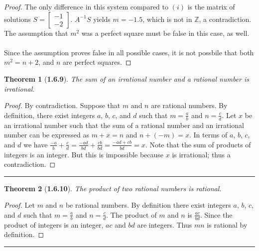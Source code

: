 \documentclass[a4paper, 12pt]{article}
\theoremstyle{plain}
\newtheorem*{theorem*}{Theorem}
\begin{document}
\begin{proof}
    The only difference in this system compared to $(i)$ is the matrix of solutions 
    $S = \left[\begin{smallmatrix}
        -1 \\
        -2
    \end{smallmatrix}\right]$. $A^{-1}S$ yields $m = -1.5$, which is not in $\mathbb{Z}$,
    a contradiction. The assumption that $m^2$ was a perfect square must be false in this case, 
    as well.
    \\ \\Since the assumption proves false in all possible cases, it is not possbile that 
    both $m^2 = n + 2$, and $n$ are perfect squares.
\end{proof}

\pagebreak


\begin{theorem*}[\textbf{1.6.9}]
    The sum of an irrational number and a rational number is irrational.
\end{theorem*}

\begin{proof}
    By contradiction. Suppose that $m$ and $n$ are rational numbers. By definition, there exist integers
    $a$, $b$, $c$, and $d$ such that $m = \frac{a}{b}$ and $n = \frac{c}{d}$. Let $x$ be an irrational 
    number such that the sum of a rational number and an irrational number can be expressed as 
    $m + x = n$ and $n + (-m) = x$. In terms of $a$, $b$, $c$, and $d$ we have 
    $\frac{-a}{b} + \frac{c}{d} = \frac{-ad}{bd} + \frac{cb}{bd} = \frac{-ad + cb}{bd} = x$. Note that 
    the sum of products of integers is an integer. But this is impossible because $x$ is irrational; 
    thus a contradiction.
\end{proof}
\begin{center}
    \rule{5.4in}{1pt}
\end{center}


\begin{theorem*}[\textbf{1.6.10}]
    The product of two rational numbers is rational.
\end{theorem*}

\begin{proof}
    Let $m$ and $n$ be rational numbers. By definition there exist integers $a$, $b$, $c$, and $d$ such 
    that $m = \frac{a}{b}$ and $n = \frac{c}{d}$. The product of $m$ and $n$ is $\frac{ac}{bd}$. Since 
    the product of integers is an integer, $ac$ and $bd$ are integers. Thus $mn$ is rational by 
    definition.
\end{proof}
\begin{center}
    \rule{5.4in}{1pt}
\end{center}
\end{document}
